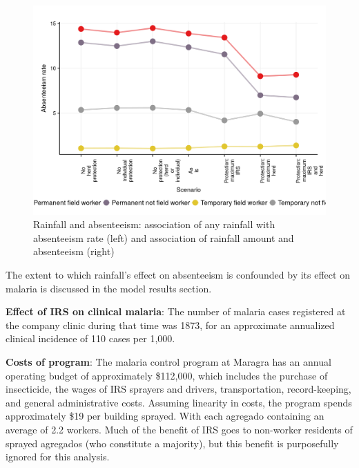 \documentclass[]{article}
\begin{document}
\begin{figure}[h]

{\centering \includegraphics{figures/unnamed-chunk-25-1} 

}

\caption{Rainfall and absenteeism: association of any rainfall with absenteeism rate (left) and association of rainfall amount and absenteeism (right)}\label{fig:unnamed-chunk-25}
\end{figure}

The extent to which rainfall's effect on absenteeism is confounded by
its effect on malaria is discussed in the model results section.

\textbf{Effect of IRS on clinical malaria}: The number of malaria cases
registered at the company clinic during that time was 1873, for an
approximate annualized clinical incidence of 110 cases per 1,000.

\textbf{Costs of program}: The malaria control program at Maragra has an
annual operating budget of approximately \$112,000, which includes the
purchase of insecticide, the wages of IRS sprayers and drivers,
transportation, record-keeping, and general administrative costs.
Assuming linearity in costs, the program spends approximately \$19 per
building sprayed. With each agregado containing an average of 2.2
workers. Much of the benefit of IRS goes to non-worker residents of
sprayed agregados (who constitute a majority), but this benefit is
purposefully ignored for this analysis.
\end{document}
